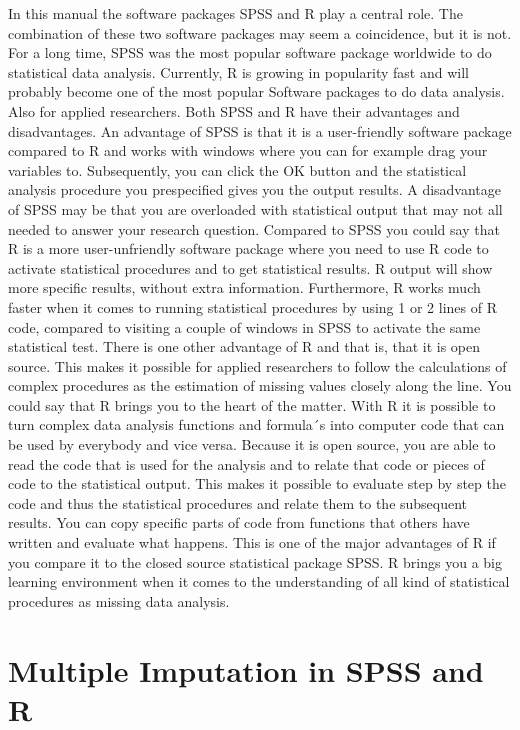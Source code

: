 \documentclass[]{book}
\theoremstyle{definition}
\theoremstyle{definition}
\theoremstyle{definition}
\theoremstyle{remark}
\begin{document}
In this manual the software packages SPSS and R play a central role. The
combination of these two software packages may seem a coincidence, but
it is not. For a long time, SPSS was the most popular software package
worldwide to do statistical data analysis. Currently, R is growing in
popularity fast and will probably become one of the most popular
Software packages to do data analysis. Also for applied researchers.
Both SPSS and R have their advantages and disadvantages. An advantage of
SPSS is that it is a user-friendly software package compared to R and
works with windows where you can for example drag your variables to.
Subsequently, you can click the OK button and the statistical analysis
procedure you prespecified gives you the output results. A disadvantage
of SPSS may be that you are overloaded with statistical output that may
not all needed to answer your research question. Compared to SPSS you
could say that R is a more user-unfriendly software package where you
need to use R code to activate statistical procedures and to get
statistical results. R output will show more specific results, without
extra information. Furthermore, R works much faster when it comes to
running statistical procedures by using 1 or 2 lines of R code, compared
to visiting a couple of windows in SPSS to activate the same statistical
test. There is one other advantage of R and that is, that it is open
source. This makes it possible for applied researchers to follow the
calculations of complex procedures as the estimation of missing values
closely along the line. You could say that R brings you to the heart of
the matter. With R it is possible to turn complex data analysis
functions and formula´s into computer code that can be used by everybody
and vice versa. Because it is open source, you are able to read the code
that is used for the analysis and to relate that code or pieces of code
to the statistical output. This makes it possible to evaluate step by
step the code and thus the statistical procedures and relate them to the
subsequent results. You can copy specific parts of code from functions
that others have written and evaluate what happens. This is one of the
major advantages of R if you compare it to the closed source statistical
package SPSS. R brings you a big learning environment when it comes to
the understanding of all kind of statistical procedures as missing data
analysis.

\section{Multiple Imputation in SPSS and
R}\label{multiple-imputation-in-spss-and-r}
\end{document}

